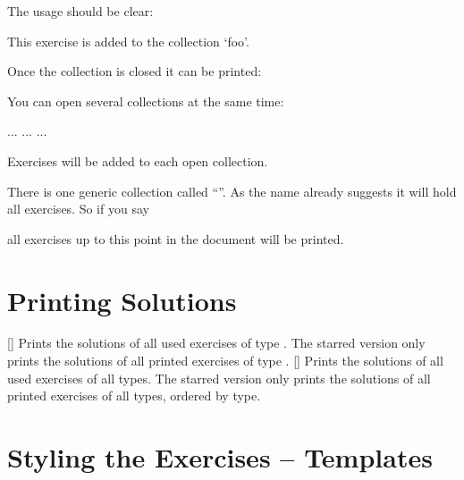\documentclass[load-preamble+]{cnltx-doc}
\begin{document}
The usage should be clear:
\begin{example}[outside]
  \begin{exercise}
    This exercise is added to the collection `foo'.
  \end{exercise}
\end{example}
Once the collection is closed it can be printed:
\begin{example}
\end{example}

You can open several collections at the same time:
\begin{sourcecode}
    ...
    ...
    ...
\end{sourcecode}
Exercises will be added to each open collection.

There is one generic collection called \enquote{}.  As the
name already suggests it will hold all exercises.  So if you say
\begin{sourcecode}
\end{sourcecode}
all exercises up to this point in the document will be printed.

\section{Printing Solutions}\label{sec:printing-solutions}

\begin{commands}
  [\sarg{}]
    Prints the solutions of all used exercises of type .
    The starred version only prints the solutions of all printed exercises of
    type .
  [\sarg{}]
    Prints the solutions of all used exercises of all types.  The starred
    version only prints the solutions of all printed exercises of all types,
    ordered by type.
\end{commands}

\begin{example}
  \printsolutions
\end{example}

\section{Styling the Exercises -- Templates}\label{sec:styl-exerc-templ}
\end{document}
